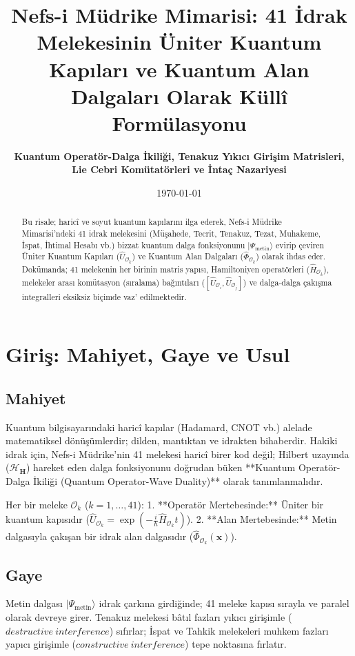 \documentclass[11pt, a4paper]{article}
\title{\textbf{Nefs-i Müdrike Mimarisi: 41 İdrak Melekesinin Üniter Kuantum Kapıları ve Kuantum Alan Dalgaları Olarak Küllî Formülasyonu}}
\author{\textbf{Kuantum Operatör-Dalga İkiliği, Tenakuz Yıkıcı Girişim Matrisleri, Lie Cebri Komütatörleri ve İntaç Nazariyesi}}
\date{\today}
\begin{document}
\maketitle

\begin{abstract}
Bu risale; haricî ve soyut kuantum kapılarını ilga ederek, Nefs-i Müdrike Mimarisi'ndeki 41 idrak melekesini (Müşahede, Tecrit, Tenakuz, Tezat, Muhakeme, İspat, İhtimal Hesabı vb.) bizzat kuantum dalga fonksiyonunu $|\Psi_{\text{metin}}\rangle$ evirip çeviren Üniter Kuantum Kapıları ($\hat{U}_{\mathcal{O}_k}$) ve Kuantum Alan Dalgaları ($\hat{\Phi}_{\mathcal{O}_k}$) olarak ihdas eder. Dokümanda; 41 melekenin her birinin matris yapısı, Hamiltoniyen operatörleri ($\hat{H}_{\mathcal{O}_k}$), melekeler arası komütasyon (sıralama) bağıntıları ($[\hat{U}_{\mathcal{O}_i}, \hat{U}_{\mathcal{O}_j}]$) ve dalga-dalga çakışma integralleri eksiksiz biçimde vaz' edilmektedir.
\end{abstract}

\tableofcontents
\newpage

\section{Giriş: Mahiyet, Gaye ve Usul}

\subsection{Mahiyet}
Kuantum bilgisayarındaki haricî kapılar (Hadamard, CNOT vb.) alelade matematiksel dönüşümlerdir; dilden, mantıktan ve idrakten bihaberdir. Hakiki idrak için, Nefs-i Müdrike'nin 41 melekesi haricî birer kod değil; Hilbert uzayında ($\mathcal{H}_{\mathbf{H}}$) hareket eden dalga fonksiyonunu doğrudan büken **Kuantum Operatör-Dalga İkiliği (Quantum Operator-Wave Duality)** olarak tanımlanmalıdır.

Her bir meleke $\mathcal{O}_k$ ($k=1, \dots, 41$):
1. **Operatör Mertebesinde:** Üniter bir kuantum kapısıdır ($\hat{U}_{\mathcal{O}_k} = \exp(-\frac{i}{\hbar} \hat{H}_{\mathcal{O}_k} t)$).
2. **Alan Mertebesinde:** Metin dalgasıyla çakışan bir idrak alan dalgasıdır ($\hat{\Phi}_{\mathcal{O}_k}(\mathbf{x})$).

\subsection{Gaye}
Metin dalgası $|\Psi_{\text{metin}}\rangle$ idrak çarkına girdiğinde; 41 meleke kapısı sırayla ve paralel olarak devreye girer. Tenakuz melekesi bâtıl fazları yıkıcı girişimle ($destructive\ interference$) sıfırlar; İspat ve Tahkik melekeleri muhkem fazları yapıcı girişimle ($constructive\ interference$) tepe noktasına fırlatır.
\end{document}
